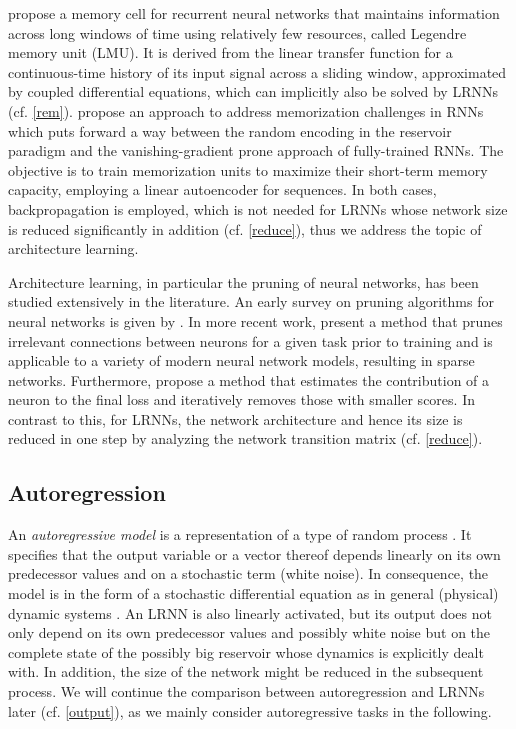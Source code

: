 \documentclass[preprint,12pt,times,authoryear]{elsarticle}%
\theoremstyle{definition}
\begin{document}
\citet{VKE19} propose a memory cell for recurrent neural networks that maintains
information across long windows of time using relatively few resources, called
Legendre memory unit (LMU). It is derived from the linear transfer function for
a continuous-time history of its input signal across a sliding window,
approximated by coupled differential equations, which can implicitly also be
solved by LRNNs (cf. \cref{rem}).
\citet{CSB21} propose an approach to address memorization challenges in RNNs
which puts forward a way between the random encoding in the reservoir paradigm
and the vanishing-gradient prone approach of fully-trained RNNs. The objective
is to train memorization units to maximize their short-term memory capacity,
employing a linear autoencoder for sequences. In both cases, backpropagation is
employed, which is not needed for LRNNs whose network size is reduced
significantly in addition (cf. \cref{reduce}), thus we address the topic of
architecture learning.

Architecture learning, in particular the pruning of neural networks, has been
studied extensively in the literature. An early survey on pruning algorithms
for neural networks is given by \citet{Ree93}. In more recent work,
\citet{LAT19} present a method that prunes irrelevant connections between
neurons for a given task prior to training and is applicable to a variety of
modern neural network models, resulting in sparse networks. Furthermore,
\citet{MM+19} propose a method that estimates the contribution of a neuron to
the final loss and iteratively removes those with smaller scores. In contrast to
this, for LRNNs, the network architecture and hence its size is reduced in one
step by analyzing the network transition matrix (cf. \cref{reduce}).

\subsection{Autoregression}\label{regress}

An \emph{autoregressive model} is a representation of a type of random process
\citep{Aka69}. It specifies that the output variable or a vector thereof depends
linearly on its own predecessor values and on a stochastic term (white noise). In
consequence, the model is in the form of a stochastic differential equation as in
general (physical) dynamic systems \citep{CK14}. An LRNN is also linearly
activated, but its output does not only depend on its own predecessor values and
possibly white noise but on the complete state of the possibly big reservoir
whose dynamics is explicitly dealt with. In addition, the size of the network
might be reduced in the subsequent process. We will continue the comparison
between autoregression and LRNNs later (cf. \cref{output}), as we mainly consider
autoregressive tasks in the following.
\end{document}
